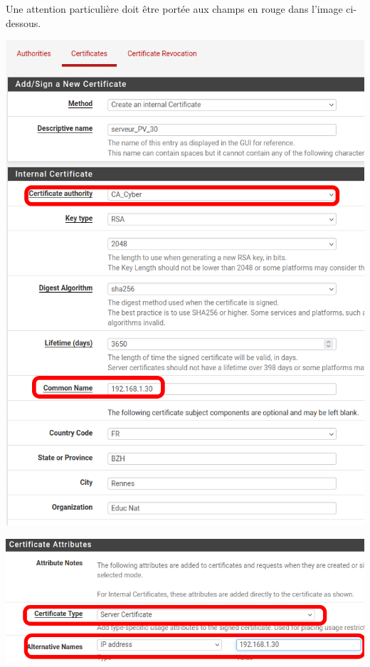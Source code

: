 \documentclass[french, 12pt]{article}%
\begin{document}
Une attention particulière doit être portée aux champs en rouge dans l'image ci-dessous.

\begin{center}
\includegraphics[scale=0.5]{./ressource/Certif_Formation.png}
\end{center}

\begin{center}
\includegraphics[scale=0.5]{./ressource/Certif_Formation2.png}
\end{center}
\end{document}
